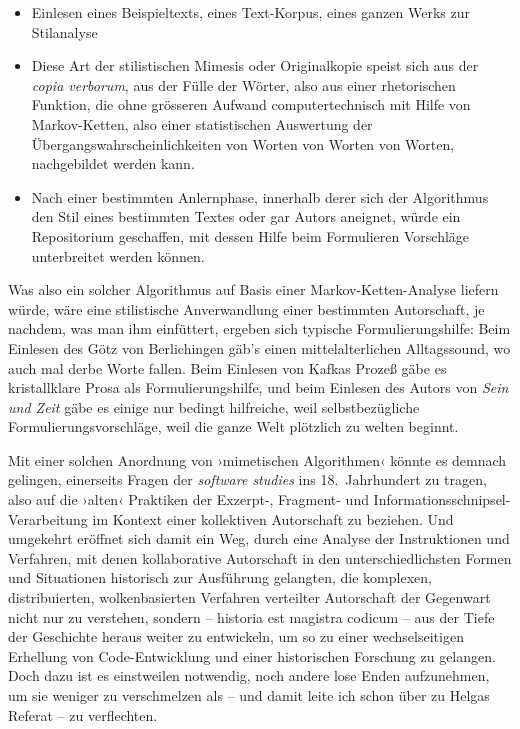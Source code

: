 \documentclass[a4paper,11pt]{article}
\newcommand{\inanf}[1]{›#1‹}
\newcommand{\ueber}[1]{{\color{crimson}[#1]}}
\begin{document}
\begin{itemize}
\item Einlesen eines Beispieltexts, eines Text-Korpus, eines ganzen Werks zur Stilanalyse
\item Diese Art der stilistischen Mimesis oder Originalkopie speist sich aus der \emph{copia verborum}, aus der Fülle der Wörter, also aus einer rhetorischen Funktion, die ohne grösseren Aufwand computertechnisch mit Hilfe von Markov-Ketten, also einer statistischen Auswertung der Übergangswahrscheinlichkeiten von Worten von Worten von Worten, nachgebildet werden kann. 
%
\item Nach einer bestimmten Anlernphase, innerhalb derer sich der Algorithmus den Stil eines bestimmten Textes oder gar Autors aneignet, würde ein Repositorium geschaffen, mit dessen Hilfe beim Formulieren Vorschläge unterbreitet werden können. %
\end{itemize}
Was also ein solcher Algorithmus auf Basis einer Markov-Ketten-Analyse liefern würde, wäre eine stilistische Anverwandlung einer bestimmten Autorschaft, je nachdem, was man ihm einfüttert, ergeben sich typische Formulierungshilfe: Beim Einlesen des Götz von Berlichingen gäb's einen mittelalterlichen Alltagssound, wo auch mal derbe Worte fallen. Beim Einlesen von Kafkas Prozeß gäbe es kristallklare Prosa als Formulierungshilfe, und beim Einlesen des Autors von \emph{Sein und Zeit} gäbe es einige nur bedingt hilfreiche, weil selbstbezügliche Formulierungsvorschläge, weil die ganze Welt plötzlich zu welten beginnt.

Mit einer solchen Anordnung von \inanf{mimetischen Algorithmen} könnte es demnach gelingen, einerseits Fragen der \emph{software studies} ins 18.~Jahrhundert zu tragen, also auf die \inanf{alten} Praktiken der Exzerpt-, Fragment- und Informationsschnipsel-Verarbeitung im Kontext einer kollektiven Autorschaft zu beziehen. Und umgekehrt eröffnet sich damit ein Weg, durch eine Analyse der Instruktionen und Verfahren, mit denen kollaborative Autorschaft in den unterschiedlichsten Formen und Situationen historisch zur Ausführung gelangten, die komplexen, distribuierten, wolkenbasierten Verfahren verteilter Autorschaft der Gegenwart nicht nur zu verstehen, sondern – historia est magistra codicum – aus der Tiefe der Geschichte heraus weiter zu entwickeln, um so zu einer wechselseitigen Erhellung von Code-Entwicklung und einer historischen Forschung zu gelangen. Doch dazu ist es einstweilen notwendig, noch andere lose Enden aufzunehmen, um sie weniger zu verschmelzen als – und damit leite ich schon über zu Helgas Referat – zu verflechten.
\end{document}
